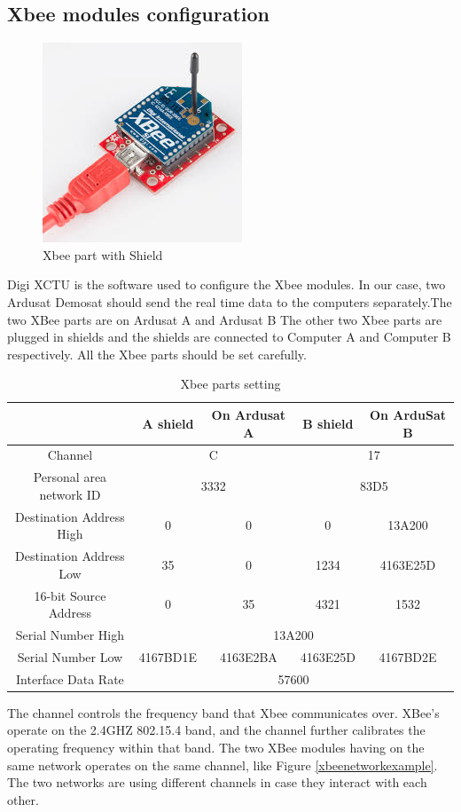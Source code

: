 \subsection{Xbee modules configuration}
\begin{figure}[!h]
\centering
\includegraphics{fig/DOE/XbeeShield}
\caption{Xbee part with Shield}
\end{figure}
Digi XCTU\cite{DigiCite} is the software used to configure the Xbee modules. In our case, two Ardusat Demosat should send the real time data to the computers separately.The two XBee parts are on Ardusat A and Ardusat B The other two Xbee parts are plugged in shields and the shields are connected to Computer A and Computer B respectively. All the Xbee parts should be set carefully\cite{XbeeSetting}. 
\begin{table}[!h]
\renewcommand\arraystretch{2}
	\begin{center}
	\caption{Xbee parts setting}\label{Xbee-configuration}
	\begin{tabular}{|c|c|c|c|c|}
	\hline
	\backslashbox{\textbf{Setting}}{\textbf{Xbee part}} & \textbf{A shield} & \textbf{On Ardusat A} & \textbf{B shield} & \textbf{On ArduSat B}\\ \hline
	Channel & \multicolumn{2}{c|}{C} &\multicolumn{2}{c|}{17}  \\ \hline
	Personal area network ID & \multicolumn{2}{c|}{3332}& \multicolumn{2}{c|}{83D5}\\ \hline
	Destination Address High & 0 & 0 & 0 & 13A200\\ \hline
	Destination Address Low & 35 & 0 & 1234&4163E25D\\ \hline
	16-bit Source Address & 0 & 35 & 4321 & 1532\\ \hline
	Serial Number High & \multicolumn{4}{c|}{13A200}\\ \hline
	Serial Number Low & 4167BD1E & 4163E2BA & 4163E25D & 4167BD2E\\ \hline
	Interface Data Rate	 & \multicolumn{4}{c|}{57600}\\ \hline
	\end{tabular}	
	\end{center}
\end{table}
The channel controls the frequency band that Xbee communicates over. XBee's operate on the 2.4GHZ 802.15.4 band, and the channel further calibrates the operating frequency within that band. The two XBee modules having on the same network operates on the same channel, like Figure \ref{xbeenetworkexample}.  The two networks are using different channels in case they interact with each other.

